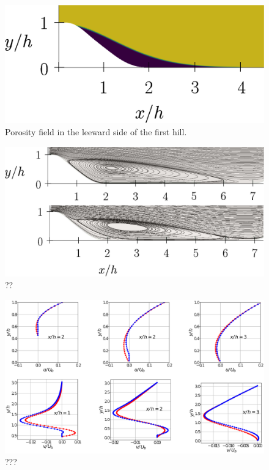 \begin{figure}[h]
\centering
\includegraphics[width=0.7\linewidth]{chapter_5/figure/por}
\caption{Porosity field in the leeward side of the first hill.}
\label{fig:por_gauss}
\end{figure}


\begin{figure}[h]
	\centering
	\includegraphics[width=1\linewidth]{chapter_5/figure/streamlines}
	\caption{??}
	\label{fig:streamlines}
\end{figure}

\begin{figure}[h]
	\centering
	\includegraphics[width=1\linewidth]{chapter_5/figure/cuts_hill}
	\caption{???}
	\label{fig:cuts_hill}
\end{figure}





